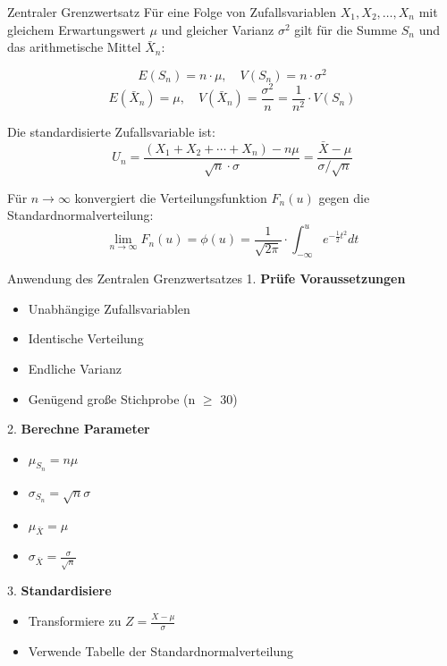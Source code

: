 \begin{theorem}{Zentraler Grenzwertsatz}
Für eine Folge von Zufallsvariablen $X_1, X_2, \ldots, X_n$ mit gleichem Erwartungswert $\mu$ und gleicher Varianz $\sigma^2$ gilt für die Summe $S_n$ und das arithmetische Mittel $\bar{X}_n$:

$$E(S_n)=n \cdot \mu, \quad V(S_n)=n \cdot \sigma^2$$
$$E(\bar{X}_n)=\mu, \quad V(\bar{X}_n)=\frac{\sigma^2}{n}=\frac{1}{n^2} \cdot V(S_n)$$

Die standardisierte Zufallsvariable ist:
$$U_n=\frac{(X_1+X_2+\cdots+X_n)-n\mu}{\sqrt{n} \cdot \sigma}=\frac{\bar{X}-\mu}{\sigma/\sqrt{n}}$$

Für $n \to \infty$ konvergiert die Verteilungsfunktion $F_n(u)$ gegen die Standardnormalverteilung:
$$\lim_{n\to\infty} F_n(u) = \phi(u) = \frac{1}{\sqrt{2\pi}} \cdot \int_{-\infty}^u e^{-\frac{1}{2}t^2} dt$$
\end{theorem}

\begin{KR}{Anwendung des Zentralen Grenzwertsatzes}
1. \textbf{Prüfe Voraussetzungen}
   \begin{itemize}
   \item Unabhängige Zufallsvariablen
   \item Identische Verteilung
   \item Endliche Varianz
   \item Genügend große Stichprobe (n $\geq$ 30)
   \end{itemize}

2. \textbf{Berechne Parameter}
   \begin{itemize}
   \item $\mu_{S_n} = n\mu$
   \item $\sigma_{S_n} = \sqrt{n}\sigma$
   \item $\mu_{\bar{X}} = \mu$
   \item $\sigma_{\bar{X}} = \frac{\sigma}{\sqrt{n}}$
   \end{itemize}

3. \textbf{Standardisiere}
   \begin{itemize}
   \item Transformiere zu $Z = \frac{X-\mu}{\sigma}$
   \item Verwende Tabelle der Standardnormalverteilung
   \end{itemize}
\end{KR}

